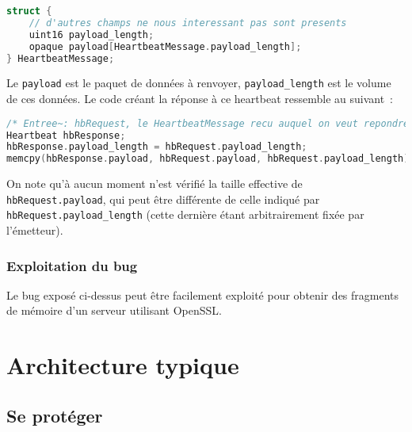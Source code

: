 \documentclass[a4paper,oneside,1pt]{article}
\begin{document}

\begin{lstlisting}[language=C]
struct {
	// d'autres champs ne nous interessant pas sont presents
	uint16 payload_length;
	opaque payload[HeartbeatMessage.payload_length];
} HeartbeatMessage;
\end{lstlisting}

Le \texttt{payload} est le paquet de données à renvoyer, \texttt{payload\_length} est le volume de ces données. Le code créant la réponse à ce heartbeat ressemble au suivant~:

\begin{lstlisting}[language=C]
/* Entree~: hbRequest, le HeartbeatMessage recu auquel on veut repondre */
Heartbeat hbResponse;
hbResponse.payload_length = hbRequest.payload_length;
memcpy(hbResponse.payload, hbRequest.payload, hbRequest.payload_length);
\end{lstlisting}

On note qu'à aucun moment n'est vérifié la taille effective de \texttt{hbRequest.payload}, qui peut être différente de celle indiqué par \texttt{hbRequest.payload\_length} (cette dernière étant arbitrairement fixée par l'émetteur).

\subsubsection{Exploitation du bug}
Le bug exposé ci-dessus peut être facilement exploité pour obtenir des fragments de mémoire d'un serveur utilisant OpenSSL.


\section{Architecture typique}





\subsection{Se protéger}
\end{document}
